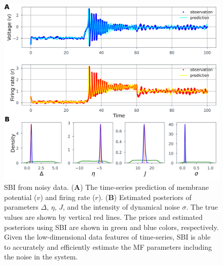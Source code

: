 \documentclass[preprint,11pt,authoryear]{elsarticle}
\begin{document}
\begin{figure}[ht]
    \centering
    \includegraphics[width=\linewidth]{Figs/FigS7.png}
    \renewcommand{\thefigure}{S\arabic{figure}}
    \caption{SBI from noisy data.  (\textbf{A}) The time-series prediction of membrane potential ($v$) and firing rate ($r$). (\textbf{B}) Estimated posteriors of parameters $\Delta$, $\eta$, $J$, and the intensity of dynamical noise $\sigma$. The true values are shown by vertical red lines. The priors and estimated posteriors using SBI are shown in green and blue colors, respectively. Given the low-dimensional data features of time-series, SBI is able to accurately and efficiently estimate the MF parameters including the noise in the system. }
    \label{fig:SBI_SDE_Istep_RV_NoiseEstimation}
\end{figure}
\end{document}
